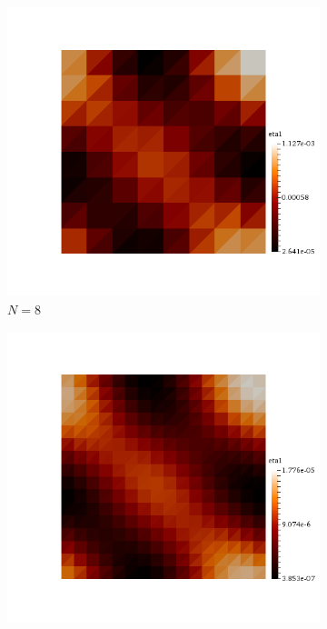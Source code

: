 \mbox{}\\

\begin{figure}[h!]
  \centering
  \begin{subfigure}[b]{0.24\textwidth}
    \includegraphics[width=\textwidth,height=\textheight,keepaspectratio,height=\textheight,keepaspectratio]{figures/2_mpet/no_transfer/space/eta1_8.png}
    \caption{$N=8$}
  \end{subfigure}
  \begin{subfigure}[b]{0.24\textwidth}
    \includegraphics[width=\textwidth,height=\textheight,keepaspectratio,height=\textheight,keepaspectratio]{figures/2_mpet/no_transfer/space/eta1_16.png}

\end{subfigure}
\end{figure}
